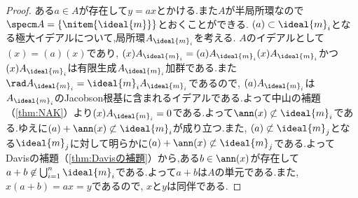 \begin{proof}
	ある$a\in A$が存在して$y=ax$とかける.また$A$が半局所環なので$\specm A=\{\nitem{\ideal{m}}\}$とおくことができる. $(a)\subset\ideal{m}_i$となる極大イデアルについて,局所環$A_{\ideal{m}_i}$を考える. $A$のイデアルとして$(x)=(a)(x)$であり, $(x)A_{\ideal{m}_i}=(a)A_{\ideal{m}_i}(x)A_{\ideal{m}_i}$かつ$(x)A_{\ideal{m}_i}$は有限生成$A_{\ideal{m}_i}$加群である.また$\rad A_{\ideal{m}_i}=\ideal{m}_iA_{\ideal{m}_i}$であるので, $(a)A_{\ideal{m}_i}$は$A_{\ideal{m}_i}$のJacobson根基に含まれるイデアルである.よって中山の補題（\ref{thm:NAK}）より$(x)A_{\ideal{m}_i}=0$である.よって$\ann (x)\not\subset\ideal{m}_i$である.ゆえに$(a)+\ann (x)\not\subset\ideal{m}_i$が成り立つ.また, $(a)\not\subset\ideal{m}_j$となる$\ideal{m}_j$に対して明らかに$(a)+\ann (x)\not\subset\ideal{m}_j$である.よってDavisの補題（\ref{thm:Davisの補題}）から,ある$b\in\ann(x)$が存在して$a+b\not\in\bigcup_{i=1}^n\ideal{m}_i$である.よって$a+b$は$A$の単元である.また, $x(a+b)=ax=y$であるので, $x$と$y$は同伴である.
\end{proof}